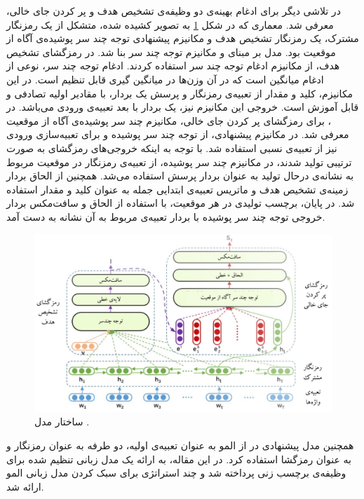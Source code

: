 در تلاشی دیگر برای ادغام بهینه‌ی دو وظیفه‌ی تشخیص هدف و پر کردن جای خالی،  \cite{yang:2021} معرفی شد. معماری  که در شکل \ref{Fig:aise} به تصویر کشیده شده، متشکل از یک رمزنگار مشترک، یک رمزنگار تشخیص هدف و مکانیزم پیشنهادی توجه چند سر پوشیده‌ی آگاه از موقعیت بود. مدل  بر مبنای  و مکانیزم توجه چند سر بنا شد. در رمزگشای تشخیص هدف، از مکانیزم ادغام توجه چند سر استفاده کردند. ادغام توجه چند سر، نوعی از ادغام میانگین است که در آن وزن‌ها در میانگین گیری قابل تنظیم است. در این مکانیزم، کلید و مقدار از تعبیه‌ی رمزنگار و پرسش یک بردار، با مقادیر اولیه تصادفی و قابل آموزش است. خروجی این مکانیزم نیز، یک بردار با بعد تعبیه‌ی ورودی می‌باشد. در ، برای رمزگشای پر کردن جای خالی، مکانیزم چند سر پوشیده‌ی آگاه از موقعیت معرفی شد. در مکانیزم پیشنهادی، از توجه چند سر پوشیده و برای تعبیه‌سازی ورودی نیز از تعبیه‌ی نسبی \cite{relative_positioning_transformer} استفاده شد. با توجه به اینکه خروجی‌های رمزگشای  به صورت ترتیبی تولید شدند، در مکانیزم چند سر پوشیده، از تعبیه‌ی رمزنگار در موقعیت مربوط به نشانه‌ی درحال تولید به عنوان بردار پرسش استفاده می‌شد. همچنین از الحاق بردار زمینه‌ی تشخیص هدف و ماتریس تعبیه‌ی ابتدایی جمله به عنوان کلید و مقدار استفاده شد. در پایان، برچسب تولیدی در هر موقعیت، با استفاده از الحاق و سافت‌مکس بردار خروجی توجه چند سر پوشیده با بردار تعبیه‌ی مربوط به آن نشانه به دست آمد.
\begin{figure}[!htb]
	\centering
	\includegraphics[scale=0.5]{Figures/aise.pdf}
	\caption[ساختار مدل ]{ساختار مدل  \cite{yang:2021}.}
	\label{Fig:aise}
\end{figure}


همچنین مدل پیشنهادی در \cite{Siddhant:2019} از المو به عنوان تعبیه‌ی اولیه،  دو طرفه به عنوان رمزنگار و  به عنوان رمزگشا استفاده کرد. در این مقاله، به ارائه یک مدل زبانی تنظیم شده برای وظیفه‌ی برچسب زنی پرداخته شد و چند استراتژی برای سبک کردن مدل زبانی المو ارائه شد.
